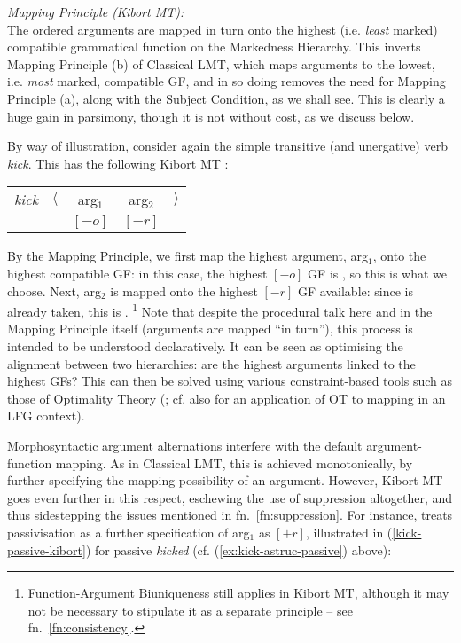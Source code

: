 \documentclass[output=paper]{langscibook}
\begin{document}
\ea\label{ex:kibort-mapping-principle}
\textit{Mapping Principle (Kibort MT):}\\
The ordered arguments are mapped in turn onto the highest (i.e. \emph{least}
marked) compatible grammatical function on the Markedness Hierarchy.
\z
%
This inverts Mapping Principle (b) of Classical LMT, which maps arguments to the
lowest, i.e. \emph{most} marked, compatible GF, and in so doing removes the need
for Mapping Principle (a), along with the Subject Condition, as we shall see.
This is clearly a huge gain in parsimony, though it is not without cost, as we
discuss below.

By way of illustration, consider again the simple transitive (and unergative)
verb \textit{kick}. This has the following Kibort MT \astruc:

\ea
\begin{tabular}[t]{lrccl}
  \textit{kick} & $\langle$&arg$_{1}$&arg$_{2}$&$\rangle$\\
  && $[-o]$ & $[-r]$
\end{tabular}
\z
%
By the Mapping Principle, we first map the highest argument, arg$_{1}$, onto the
highest compatible GF: in this case, the highest $[-o]$ GF is \SUBJ, so this is
what we choose. Next, arg$_{2}$ is mapped onto the highest $[-r]$ GF available:
since \SUBJ is already taken, this is \OBJ.%
%
\footnote{Function-Argument Biuniqueness still applies in Kibort MT, although
  it may not be necessary to stipulate it as a separate principle -- see
  fn.~\ref{fn:consistency}.}
%
Note that despite the procedural talk here and in the Mapping Principle itself
(arguments are mapped ``in turn''), this process is intended to be understood
declaratively. It can be seen as optimising the alignment between two
hierarchies: are the highest arguments linked to the highest GFs? This can then
be solved using various constraint-based tools such as those of Optimality
Theory (\citealp{PrinceSmolensky1993,PrinceSmolensky2004}; cf. also
\citealt{Asudeh01} for an application of OT to mapping in an LFG context).

Morphosyntactic argument alternations interfere with the default
argument-function mapping. As in Classical LMT, this is achieved monotonically,
by further specifying the mapping possibility of an argument. However, Kibort MT
goes even further in this respect, eschewing the use of suppression altogether,
and thus sidestepping the issues mentioned in fn.~\ref{fn:suppression}. For
instance, \citet[170]{Kibort2001} treats passivisation as a further
specification of arg$_{1}$ as $[+r]$, illustrated in (\ref{kick-passive-kibort})
for passive \textit{kicked} (cf. (\ref{ex:kick-astruc-passive}) above):
\end{document}
